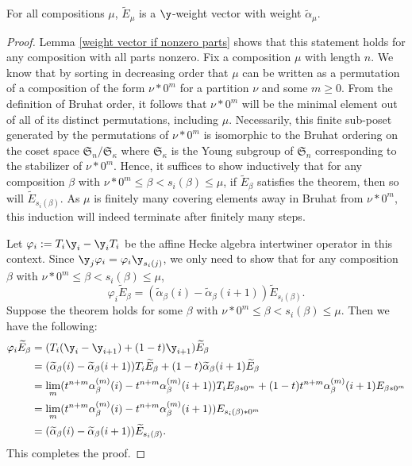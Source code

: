 \begin{thm} \label{weight vector for all}
For all compositions $\mu$, $\widetilde{E}_{\mu}$ is a $\y$-weight vector with weight $\widetilde{\alpha}_{\mu}.$
\end{thm}

\begin{proof}
 Lemma \ref{weight vector if nonzero parts} shows that this statement holds for any composition with all parts nonzero. Fix a composition $\mu$ with length $n$. We know that by sorting in decreasing order that $\mu$ can be written as a permutation of a composition of the form $\nu * 0^m$ for a partition $\nu$ and some $m \geq 0$. From the definition of Bruhat order, it follows that $\nu*0^m$ will be the minimal element out of all of its distinct permutations, including $\mu$. Necessarily, this finite sub-poset generated by the permutations of $\nu*0^m$ is isomorphic to the Bruhat ordering on the coset space $\mathfrak{S}_n/\mathfrak{S}_{\kappa}$ where $\mathfrak{S}_{\kappa}$ is the Young subgroup of $\mathfrak{S}_n$ corresponding to the stabilizer of $\nu*0^m$. Hence, it suffices to show inductively that for any composition $\beta$ with $\nu*0^m \leq \beta < s_i(\beta) \leq \mu$, if $\widetilde{E}_{\beta}$ satisfies the theorem, then so will $\widetilde{E}_{s_i(\beta)}$. As $\mu$ is finitely many covering elements away in Bruhat from $\nu*0^m$, this induction will indeed terminate after finitely many steps.
 
Let $\varphi_i := T_i\y_i-\y_iT_i$ be the affine Hecke algebra intertwiner operator in this context. Since $\y_j\varphi_i = \varphi_i \y_{s_i(j)}$, we only need to show that for any composition $\beta$ with $\nu*0^m \leq \beta < s_i(\beta) \leq \mu$, $$\varphi_i \widetilde{E}_{\beta} = (\widetilde{\alpha}_{\beta}(i) - \widetilde{\alpha}_{\beta}(i+1))\widetilde{E}_{s_i(\beta)}.$$ Suppose the theorem holds for some $\beta$ with $\nu*0^m \leq \beta < s_i(\beta) \leq \mu$. Then we have the following:
\begin{align*}
    \varphi_{i}\widetilde{E}_{\beta} &= (T_i(\y_i - \y_{i+1}) + (1-t)\y_{i+1})\widetilde{E}_{\beta} \\
    &= (\widetilde{\alpha}_{\beta}(i)- \widetilde{\alpha}_{\beta}(i+1))T_i\widetilde{E}_{\beta} + (1-t)\widetilde{\alpha}_{\beta}(i+1)\widetilde{E}_{\beta} \\
    &= \lim_{m} (t^{n+m}\alpha_{\beta}^{(m)}(i)- t^{n+m}\alpha_{\beta}^{(m)}(i+1))T_iE_{\beta *0^m} + (1-t)t^{n+m}\alpha_{\beta}^{(m)}(i+1)E_{\beta *0^m} \\
    &= \lim_{m}(t^{n+m}\alpha_{\beta}^{(m)}(i)- t^{n+m}\alpha_{\beta}^{(m)}(i+1))E_{s_i(\beta) *0^m}\\
    &= (\widetilde{\alpha}_{\beta}(i) - \widetilde{\alpha}_{\beta}(i+1))\widetilde{E}_{s_i(\beta)}.
\end{align*}
This completes the proof.
\end{proof}

